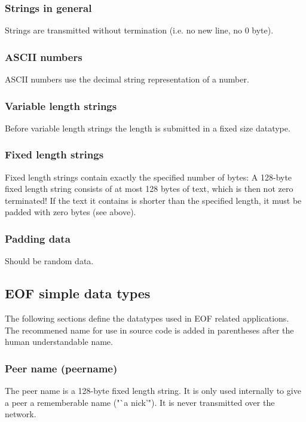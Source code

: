 \documentclass[12pt,a4paper]{book}
\begin{document}
\subsubsection{Strings in general}
Strings are transmitted without termination (i.e. no new line, no 0 byte).
\subsubsection{ASCII numbers}
ASCII numbers use the decimal string representation of a number.
\subsubsection{Variable length strings}
Before variable length strings the length is submitted in a fixed size
datatype.
\subsubsection{Fixed length strings}
Fixed length strings contain exactly the specified number of bytes:
A 128-byte fixed length string consists of at most 128 bytes of text,
which is then not zero terminated!
If the text it contains is shorter than the specified length,
it must be padded with zero bytes (see above).
\subsubsection{Padding data}
Should be random data.
\subsection{EOF simple data types}
The following sections define the datatypes used in EOF related
applications. The recommened name for use in source
code is added in parentheses after the human understandable name.
\subsubsection{Peer name (peername)}
The peer name is a 128-byte fixed length string. It is only
used internally to give a peer a rememberable name ("`a nick'").
It is never transmitted over the network.
\end{document}
